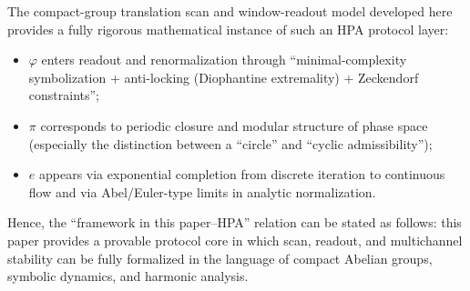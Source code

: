 The compact-group translation scan and window-readout model developed here provides a fully rigorous mathematical instance of such an HPA protocol layer:
\begin{itemize}
  \item $\varphi$ enters readout and renormalization through ``minimal-complexity symbolization + anti-locking (Diophantine extremality) + Zeckendorf constraints'';
  \item $\pi$ corresponds to periodic closure and modular structure of phase space (especially the distinction between a ``circle'' and ``cyclic admissibility'');
  \item $e$ appears via exponential completion from discrete iteration to continuous flow and via Abel/Euler-type limits in analytic normalization.
\end{itemize}
Hence, the ``framework in this paper--HPA'' relation can be stated as follows: this paper provides a provable protocol core in which scan, readout, and multichannel stability can be fully formalized in the language of compact Abelian groups, symbolic dynamics, and harmonic analysis.
